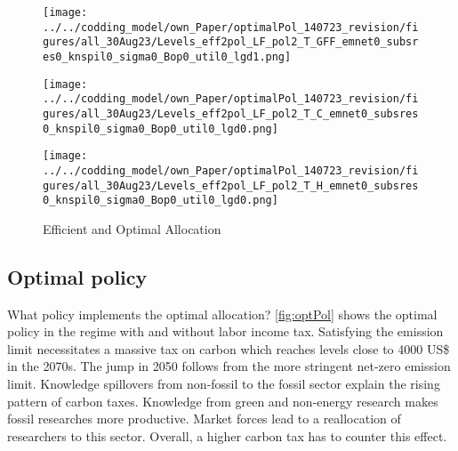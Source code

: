 \begin{figure}[h!!]
	\centering
	\caption{Efficient and Optimal Allocation }\label{fig:allo}
	\begin{minipage}[]{0.45\textwidth}
		\texttt{[image: ../../codding\_model/own\_Paper/optimalPol\_140723\_revision/figures/all\_30Aug23/Levels\_eff2pol\_LF\_pol2\_T\_GFF\_emnet0\_subsres0\_knspil0\_sigma0\_Bop0\_util0\_lgd1.png]}
	\end{minipage}

\vspace{4mm}
\begin{minipage}[]{0.45\textwidth}
\texttt{[image: ../../codding\_model/own\_Paper/optimalPol\_140723\_revision/figures/all\_30Aug23/Levels\_eff2pol\_LF\_pol2\_T\_C\_emnet0\_subsres0\_knspil0\_sigma0\_Bop0\_util0\_lgd0.png]}
\end{minipage}

\vspace{4mm}
	\begin{minipage}[]{0.45\textwidth}
		\texttt{[image: ../../codding\_model/own\_Paper/optimalPol\_140723\_revision/figures/all\_30Aug23/Levels\_eff2pol\_LF\_pol2\_T\_H\_emnet0\_subsres0\_knspil0\_sigma0\_Bop0\_util0\_lgd0.png]}
	\end{minipage}
\end{figure} 
\newpage

\subsection{Optimal policy}\label{sec:optpol}

What policy implements the optimal allocation? \autoref{fig:optPol} shows the optimal policy in the regime with and without labor income tax. Satisfying the emission limit necessitates a massive tax on carbon which reaches levels close to 4000 US\$ in the 2070s. The jump in 2050 follows from the more stringent net-zero emission limit. Knowledge spillovers from non-fossil to the fossil sector explain the rising pattern of carbon taxes. Knowledge from green and non-energy research makes fossil researches more productive. Market forces lead to a reallocation of researchers to this sector. Overall, a higher carbon tax has to counter this effect. 


